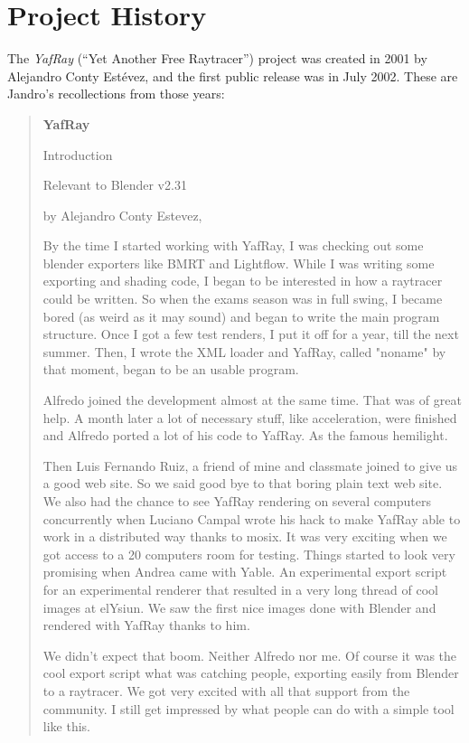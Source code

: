 \section*{Project History}
The \textit{YafRay} (``Yet Another Free Raytracer'') project was created in 2001 by Alejandro Conty Estévez, and the first public release was in July 2002. These are Jandro's recollections from those years:

\begin{quotation}
\textbf{YafRay}

Introduction

Relevant to Blender v2.31

by Alejandro Conty Estevez,

By the time I started working with YafRay, I was checking out some blender exporters like BMRT and Lightflow. While I was writing some exporting and shading code, I began to be interested in how a raytracer could be written. So when the exams season was in full swing, I became bored (as weird as it may sound) and began to write the main program structure. Once I got a few test renders, I put it off for a year, till the next summer. Then, I wrote the XML loader and YafRay, called "noname" by that moment, began to be an usable program.

Alfredo joined the development almost at the same time. That was of great help. A month later a lot of necessary stuff, like acceleration, were finished and Alfredo ported a lot of his code to YafRay. As the famous hemilight.

Then Luis Fernando Ruiz, a friend of mine and classmate joined to give us a good web site. So we said good bye to that boring plain text web site. We also had the chance to see YafRay rendering on several computers concurrently when Luciano Campal wrote his hack to make YafRay able to work in a distributed way thanks to mosix. It was very exciting when we got access to a 20 computers room for testing. Things started to look very promising when Andrea came with Yable. An experimental export script for an experimental renderer that resulted in a very long thread of cool images at elYsiun. We saw the first nice images done with Blender and rendered with YafRay thanks to him.

We didn't expect that boom. Neither Alfredo nor me. Of course it was the cool export script what was catching people, exporting easily from Blender to a raytracer. We got very excited with all that support from the community. I still get impressed by what people can do with a simple tool like this.


\end{quotation}
